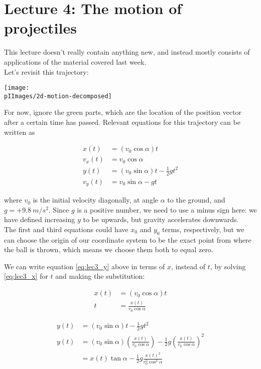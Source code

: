 \section{Lecture 4: The motion of projectiles}

This lecture doesn't really contain anything new, and instead mostly consists of applications of the material covered last week.\\
Let's revisit this trajectory:

\begin{center}
\texttt{[image: \\pIImages/2d-motion-decomposed]}
\end{center}

For now, ignore the green parts, which are the location of the position vector after a certain time has passed.
Relevant equations for this trajectory can be written as

\begin{align}
x(t) &= (v_0 \cos \alpha) t \label{eq:lec3_x}\\
v_x(t) &= v_0 \cos \alpha\\
y(t) &= (v_0 \sin \alpha) t - \frac{1}{2} g t^2 \label{eq:lec3_y}\\
v_y(t) &= v_0 \sin \alpha - g t
\end{align}

where $v_0$ is the initial velocity diagonally, at angle $\alpha$ to the ground, and $g = +\SI{9.8}{m/s^2}$. Since $g$ is a positive number, we need to use a minus sign here: we have defined increasing $y$ to be upwards, but gravity accelerates downwards.\\
The first and third equations could have $x_0$ and $y_0$ terms, respectively, but we can choose the origin of our coordinate system to be the exact point from where the ball is thrown, which means we choose them both to equal zero.

We can write equation \eqref{eq:lec3_y} above in terms of $x$, instead of $t$, by solving \eqref{eq:lec3_x} for $t$ and making the substitution:

\begin{align}
x(t) &= (v_0 \cos \alpha) t\\
t &= \frac{x(t)}{v_0 \cos \alpha}
\end{align}

\begin{align}
y(t) &= (v_0 \sin \alpha) t - \frac{1}{2} g t^2\\
y(t) &= (v_0 \sin \alpha) \left(\frac{x(t)}{v_0 \cos \alpha}\right) - \frac{1}{2} g \left(\frac{x(t)}{v_0 \cos \alpha}\right)^2\\
     &= x(t) \tan \alpha - \frac{1}{2} g \frac{x(t)^2}{v_0^2 \cos^2 \alpha}
\end{align}


